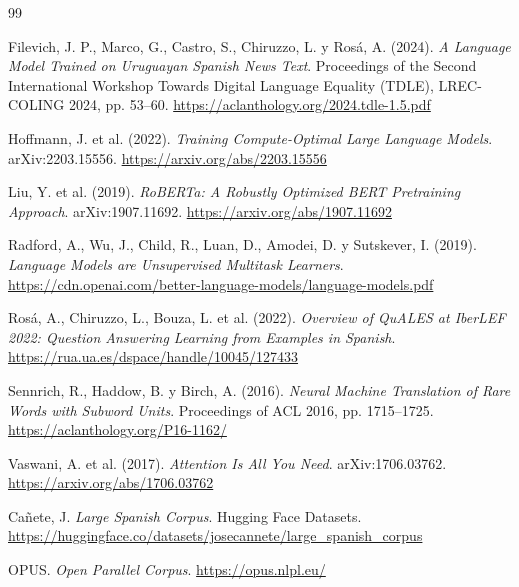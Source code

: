 \documentclass[11pt,a4paper]{article}
\begin{document}
\clearpage
\begin{thebibliography}{99}

Filevich, J. P., Marco, G., Castro, S., Chiruzzo, L. y Rosá, A. (2024).
\newblock \emph{A Language Model Trained on Uruguayan Spanish News Text}.
\newblock Proceedings of the Second International Workshop Towards Digital
Language Equality (TDLE), LREC-COLING 2024, pp. 53--60.
\newblock \url{https://aclanthology.org/2024.tdle-1.5.pdf}

Hoffmann, J. et al. (2022).
\newblock \emph{Training Compute-Optimal Large Language Models}.
\newblock arXiv:2203.15556.
\newblock \url{https://arxiv.org/abs/2203.15556}

Liu, Y. et al. (2019).
\newblock \emph{RoBERTa: A Robustly Optimized BERT Pretraining Approach}.
\newblock arXiv:1907.11692.
\newblock \url{https://arxiv.org/abs/1907.11692}

Radford, A., Wu, J., Child, R., Luan, D., Amodei, D. y Sutskever, I. (2019).
\newblock \emph{Language Models are Unsupervised Multitask Learners}.
\newblock \url{https://cdn.openai.com/better-language-models/language-models.pdf}

Rosá, A., Chiruzzo, L., Bouza, L. et al. (2022).
\newblock \emph{Overview of QuALES at IberLEF 2022: Question Answering
Learning from Examples in Spanish}.
\newblock \url{https://rua.ua.es/dspace/handle/10045/127433}

Sennrich, R., Haddow, B. y Birch, A. (2016).
\newblock \emph{Neural Machine Translation of Rare Words with Subword Units}.
\newblock Proceedings of ACL 2016, pp. 1715--1725.
\newblock \url{https://aclanthology.org/P16-1162/}

Vaswani, A. et al. (2017).
\newblock \emph{Attention Is All You Need}.
\newblock arXiv:1706.03762.
\newblock \url{https://arxiv.org/abs/1706.03762}

Cañete, J.
\newblock \emph{Large Spanish Corpus}.
\newblock Hugging Face Datasets.
\newblock \url{https://huggingface.co/datasets/josecannete/large_spanish_corpus}

OPUS.
\newblock \emph{Open Parallel Corpus}.
\newblock \url{https://opus.nlpl.eu/}

\end{thebibliography}
\end{document}
